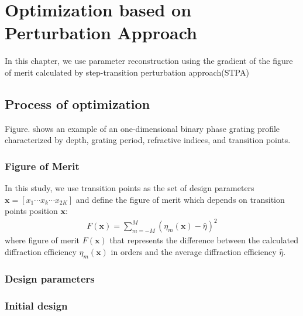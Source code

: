 \cleardoublepage
\chapter{Optimization based on Perturbation Approach}
In this chapter, we use parameter reconstruction using the gradient of the figure of merit calculated by step-transition perturbation approach(STPA)%
\section{Process of optimization}
Figure. shows an example of an one-dimensional binary phase grating profile characterized by depth, grating period, refractive indices, and transition points.

\subsection{Figure of Merit}
In this study, we use transition points as the set of design parameters $\mathbf{x} = \left[x_1\cdots x_k\cdots x_{2K}\right]$ and define the figure of merit which depends on transition points position $\mathbf{x}$:
\begin{align}\label{eq:fom}
F(\mathbf{x}) = \sum_{m=-M}^{M}(\eta_{m}(\mathbf{x})-\hat{\eta})^2
\end{align}
where figure of merit $F(\mathbf{x})$ that represents the difference between the calculated diffraction efficiency $\eta_{m}(\mathbf{x})$ in orders and  the average diffraction efficiency $ \hat{\eta}$. 
\subsection{Design parameters}

\subsection{Initial design}

